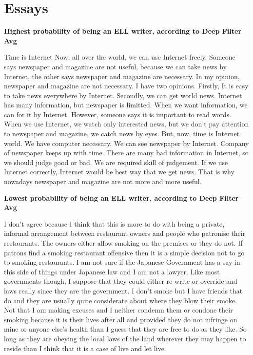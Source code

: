 \documentclass{article} %
\begin{document}
\clearpage
\section{Essays} \label{app-essays}

\textbf{Highest probability of being an ELL writer, according to Deep Filter Avg}
\begin{displayquote}
Time is Internet Now, all over the world, we can use Internet freely. Someone
says newspaper and magazine are not useful, because we can take news by
Internet, the other says newspaper and magazine are necessary. In my opinion,
newspaper and magazine are not necessary. I have two opinions. Firstly, It is
easy to take news everywhere by Internet. Secondly, we can get world news.
Internet has many information, but newspaper is limitted. When we want
information, we can for it by Internet. However, someone says it is important
to read words. When we use Internet, we watch only interested news, but we
don't pay attention to newspaper and magazine, we catch news by eyes. But, now,
time is Internet world. We have computer necessary. We can see newspaper by
Internet. Company of newspaper keeps up with time. There are many bad
information in Internet, so we should judge good or bad. We are required skill
of judgement. If we use Internet correctly, Internet would be best way that we
get news. That is why nowadays newspaper and magazine are not more and more
useful.
\end{displayquote}

\textbf{Lowest probability of being an ELL writer, according to Deep Filter Avg}
\begin{displayquote}
I don't agree because I think that this is more to do with being a private,
informal arrangement between restaurant owners and people who patronise their
restaurants. The owners either allow smoking on the premises or they do not.
If patrons find a smoking restaurant offensive then it is a simple decision
not to go to smoking restaurants. I am not sure if the Japanese Government
has a say in this side of things under Japanese law and I am not a lawyer.
Like most governments though, I suppose that they could either re-write or
override and laws really since they are the government. I don't smoke but I
have friends that do and they are usually quite considerate about where they
blow their smoke. Not that I am making excuses and I neither condemn them or
condone their smoking because it is their lives after all and provided they do
not infringe on mine or anyone else's health than I guess that they are free
to do as they like. So long as they are obeying the local laws of the land
wherever they may happen to reside than I think that it is a case of live and
let live.
\end{displayquote}
\clearpage
\end{document}
